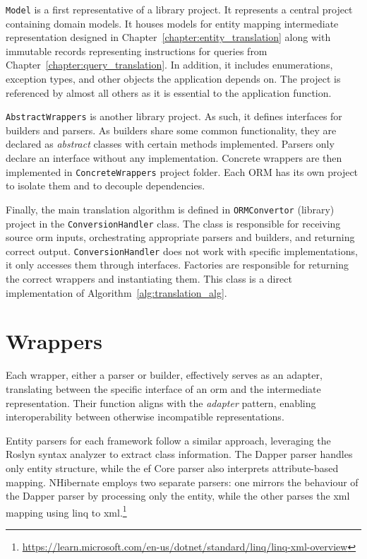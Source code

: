 \texttt{Model} is a first representative of a library project. It represents a central project containing domain models. It houses models for entity mapping intermediate representation designed in Chapter~\ref{chapter:entity_translation} along with immutable records representing instructions for queries from Chapter~\ref{chapter:query_translation}. In addition, it includes enumerations, exception types, and other objects the application depends on. The project is referenced by almost all others as it is essential to the application function.

\texttt{AbstractWrappers} is another library project. As such, it defines interfaces for builders and parsers. As builders share some common functionality, they are declared as \textit{abstract} classes with certain methods implemented. Parsers only declare an interface without any implementation. Concrete wrappers are then implemented in \texttt{ConcreteWrappers} project folder. Each ORM has its own project to isolate them and to decouple dependencies.

Finally, the main translation algorithm is defined in \texttt{ORMConvertor} (library) project in the \texttt{ConversionHandler} class. The class is responsible for receiving source \acrshort{orm} inputs, orchestrating appropriate parsers and builders, and returning correct output. \texttt{ConversionHandler} does not work with specific implementations, it only accesses them through interfaces. Factories are responsible for returning the correct wrappers and instantiating them. This class is a direct implementation of Algorithm~\ref{alg:translation_alg}.

\section{Wrappers}
Each wrapper, either a parser or builder, effectively serves as an adapter, translating between the specific interface of an \acrshort{orm} and the intermediate representation. Their function aligns with the \textit{adapter} pattern, enabling interoperability between otherwise incompatible representations.

Entity parsers for each framework follow a similar approach, leveraging the Roslyn syntax analyzer to extract class information. The Dapper parser handles only entity structure, while the \acrshort{ef} Core parser also interprets attribute-based mapping. NHibernate employs two separate parsers: one mirrors the behaviour of the Dapper parser by processing only the entity, while the other parses the \acrshort{xml} mapping using \acrshort{linq} to \acrshort{xml}.\footnote{\url{https://learn.microsoft.com/en-us/dotnet/standard/linq/linq-xml-overview}}

